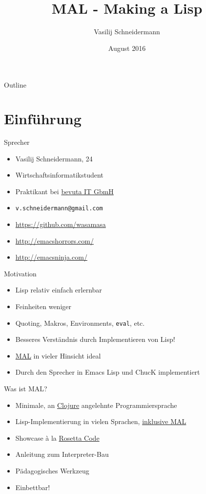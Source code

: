 \documentclass[presentation]{beamer}
\author{Vasilij Schneidermann}
\date{August 2016}
\title{MAL - Making a Lisp}
\begin{document}
\maketitle
\begin{frame}{Outline}
\tableofcontents
\end{frame}

\AtBeginSection{\frame{\sectionpage}}

\section{Einführung}
\label{sec-1}

\begin{frame}[label=sec-1-1]{Sprecher}
\begin{itemize}
\item Vasilij Schneidermann, 24
\item Wirtschaftsinformatikstudent
\item Praktikant bei \href{https://www.bevuta.com/en/}{bevuta IT GbmH}
\item \texttt{v.schneidermann@gmail.com}
\item \url{https://github.com/wasamasa}
\item \url{http://emacshorrors.com/}
\item \url{http://emacsninja.com/}
\end{itemize}
\end{frame}

\begin{frame}[fragile,label=sec-1-2]{Motivation}
 \begin{itemize}
\item Lisp relativ einfach erlernbar
\item Feinheiten weniger
\item Quoting, Makros, Environments, \texttt{eval}, etc.
\item Besseres Verständnis durch Implementieren von Lisp!
\item \href{https://github.com/kanaka/mal}{MAL} in vieler Hinsicht ideal
\item Durch den Sprecher in Emacs Lisp und ChucK implementiert
\end{itemize}
\end{frame}

\begin{frame}[label=sec-1-3]{Was ist MAL?}
\begin{itemize}
\item Minimale, an \href{http://clojure.org/}{Clojure} angelehnte Programmiersprache
\item Lisp-Implementierung in vielen Sprachen, \href{https://en.wikipedia.org/wiki/Meta-circular_evaluator}{inklusive MAL}
\item Showcase à la \href{http://rosettacode.org/wiki/Rosetta_Code}{Rosetta Code}
\item Anleitung zum Interpreter-Bau
\item Pädagogisches Werkzeug
\item Einbettbar!
\end{itemize}
\end{frame}
\end{document}
